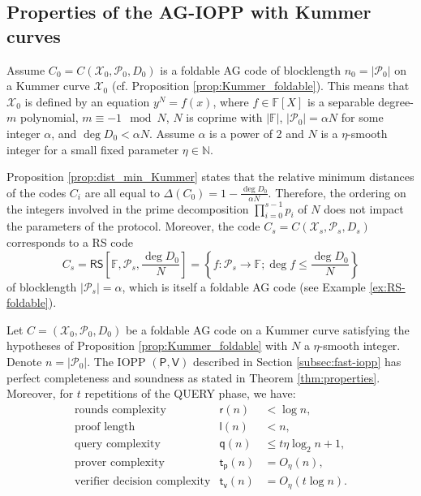 \documentclass[a4paper,USenglish,autoref]{lipics-v2021}
\newcommand\F{\mathbb{F}}
\newcommand\RS[1]{\mathsf{RS}\left[\F,#1\right]}
\newcommand\prover{\mathsf{P}}
\newcommand\verifier{\mathsf{V}}
\newcommand{\set}[1]{\left\{#1\right\}}
\newcommand{\size}[1]{\left|#1\right|}
\newcommand\calX{\mathcal{X}}
\newcommand\calP{\mathcal{P}}
\begin{document}
\subsection{Properties of the AG-IOPP with Kummer curves}

Assume $C_0 = C(\calX_0, \calP_0, D_0)$ is a foldable AG code of blocklength $n_0 = \size{\calP_0}$ on a Kummer curve $\calX_0$ (cf. Proposition \ref{prop:Kummer_foldable}). This means that $\calX_0$ is defined by an equation $y^N = f(x)$, where $f \in \F[X]$ is a separable degree-$m$ polynomial, $m \equiv -1 \mod N$, $N$ is coprime with $\size{\F}$, $\size{\calP_0} = \alpha N$ for some integer $\alpha$, and $\deg D_0 < \alpha N$. Assume $\alpha$ is a power of 2 and $N$ is a $\eta$-smooth integer for a small fixed parameter $\eta \in \mathbb N$.

Proposition \ref{prop:dist_min_Kummer} states that the relative minimum distances of the codes $C_i$ are all equal to $\Delta(C_0) = 1 - \frac{\deg D_0}{\alpha N}$. Therefore, the ordering on the integers involved in the prime decomposition $\prod_{i = 0}^{s-1}p_i$ of $N$ does not impact the parameters of the protocol. Moreover, the code $C_{s} = C(\calX_{s}, \calP_{s}, D_{s})$ corresponds to a RS code \[
C_{s} = \RS{\calP_{s}, \frac{\deg D_0}{N}} = \set{f : \calP_{s} \rightarrow \F ; \deg f \le \frac{\deg D_0}{N}}
\] of blocklength $\size{\calP_s} = \alpha$, which is itself a foldable AG code (see Example \ref{ex:RS-foldable}). 

\begin{theorem}\label{thm:kummer-properties}
	Let $C= (\calX_0, \calP_0, D_0)$ be a foldable AG code on a Kummer curve satisfying the hypotheses of Proposition \ref{prop:Kummer_foldable} with $N$ a $\eta$-smooth integer. Denote $n = \size{\calP_0}$.
	The IOPP $(\prover, \verifier)$ described in Section \ref{subsec:fast-iopp} has perfect completeness and soundness as stated in Theorem \ref{thm:properties}. Moreover, for $t$ repetitions of the \textsf{QUERY} phase, we have:
	\[
	\begin{array}{lll}
		\text{rounds complexity} &\mathsf{r}(n) &< \log n,\\
		\text{proof length} &\mathsf{l}(n) &< n,\\
		\text{query complexity} &\mathsf{q}(n) &\le t \eta \log_2 n + 1,\\
		\text{prover complexity} &\mathsf{t_p}(n) &= O_{\eta}(n),\\
		\text{verifier decision complexity} & \mathsf{t_v}(n) &= O_{\eta}(t\log n).
	\end{array}
	\]
\end{theorem}
\end{document}
